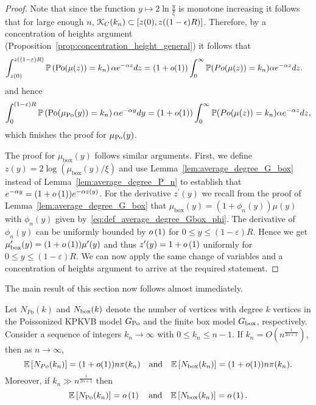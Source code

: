\begin{proof}
Note that since the function $y \mapsto 2\ln \frac{y}{\xi}$ is monotone increasing it follows that for large enough $n$, 
${\mathcal K}_C(k_n)\subset [z(0),z((1-\epsilon)R)]$. Therefore, by a concentration of heights argument (Proposition~\ref{prop:concentration_height_general}) it follows that
\begin{align*}
	\int_{z(0)}^{z((1-\varepsilon)R)} \mathbb{P}\left({\mathrm{Po}}(\mu(z))=k_n\right)\alpha e^{-\alpha z} dz 
	&= (1+o(1))\int_0^\infty \mathbb{P}(Po(\mu(z))=k_n)\alpha e^{-\alpha z}dz.
\end{align*}
and hence
\[
	\int_0^{(1-\varepsilon)R} \mathbb{P}\left({\mathrm{Po}}(\mu_{{\mathrm{Po}}}(y))=k_n\right) \alpha e^{-\alpha y}dy
	= (1+o(1))\int_0^\infty \mathbb{P}(Po(\mu(z))=k_n)\alpha e^{-\alpha z}dz,
\]
which finishes the proof for $\mu_{{\mathrm{Po}}}(y)$.

The proof for $\mu_{\mathrm{box}}(y)$ follows similar arguments. First, we define $z(y) = 2 \log (\mu_{\mathrm{box}}(y)/\xi)$ and use Lemma~\ref{lem:average_degree_G_box} instead of Lemma~\ref{lem:average_degree_P_n} to establish that $e^{-\alpha y} = (1+o\left(1\right))e^{-\alpha z(y)}$. For the derivative $z^\prime(y)$ we recall from the proof of Lemma~\ref{lem:average_degree_G_box} that $\mu_{\mathrm{box}}(y) = (1 + \phi_n(y)) \mu(y)$ with $\phi_n(y)$ given by~\eqref{eq:def_average_degree_Gbox_phi}. The derivative of $\phi_n(y)$ can be uniformly bounded by $o\left(1\right)$ for $0 \le y \le (1-\varepsilon)R$. Hence we get $\mu_{\mathrm{box}}^\prime(y) = (1+o\left(1\right)) \mu^\prime(y)$ and thus $z^\prime(y) = 1 + o\left(1\right)$ uniformly for $0 \le y \le (1-\varepsilon)R$. We can now apply the same change of variables and a concentration of heights argument to arrive at the required statement.

\end{proof}

The main result of this section now follows almost immediately.

\begin{lemma}\label{lem:expnnkn}
Let $N_{Po}(k)$ and $N_{\text{box}}(k)$ denote the number of vertices with degree $k$ vertices in the Poissonized KPKVB model $G_{{\mathrm{Po}}}$ and the finite box model $G_{\mathrm{box}}$, respectively. Consider a sequence of integers $k_n\rightarrow\infty$ with $0 \leq k_n \leq n-1$.	If $k_n = O\left(n^{\frac{1}{2\alpha+1}}\right)$, then as $n \to \infty$,
\[
	\mathbb{E}\left[N_{Po}(k_n)\right] =(1+o(1)) n {\pi}(k_n) \quad \text{and} \quad \mathbb{E}\left[N_{\text{box}}(k_n)\right] =(1+o(1)) n {\pi}(k_n).
\]
Moreover, if $k_n \gg n^{\frac{1}{2\alpha + 1}}$ then
\[
	\mathbb{E}\left[N_{{\mathrm{Po}}}(k_n)\right] = o\left(1\right) \quad \text{and} \quad \mathbb{E}\left[N_{\text{box}}(k_n)\right] = o\left(1\right).
\]
\end{lemma}

